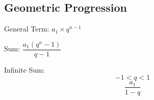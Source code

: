 \subsection{Geometric Progression}

General Term: $ a_{1} \times q^{n - 1} $

Sum: $ \dfrac{a_{1} (q^{n} - 1)}{q - 1} $

Infinite Sum:
$$ -1 < q < 1 $$
$$ \dfrac{a_{1}}{1 - q} $$
